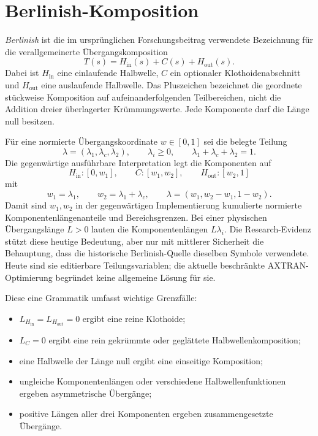 \section{Berlinish-Komposition}
\label{sec:berlinish-composition}

\emph{Berlinish} ist die im ursprünglichen Forschungsbeitrag verwendete
Bezeichnung für die verallgemeinerte Übergangskomposition
\[
T(s)
=
H_{\mathrm{in}}(s)
+
C(s)
+
H_{\mathrm{out}}(s).
\]
Dabei ist \(H_{\mathrm{in}}\) eine einlaufende Halbwelle, \(C\) ein
optionaler Klothoidenabschnitt und \(H_{\mathrm{out}}\) eine auslaufende
Halbwelle. Das Pluszeichen bezeichnet die geordnete stückweise Komposition auf
aufeinanderfolgenden Teilbereichen, nicht die Addition dreier überlagerter
Krümmungswerte. Jede Komponente darf die Länge null besitzen.

Für eine normierte Übergangskoordinate $w\in[0,1]$ sei die belegte Teilung
\[
\lambda=(\lambda_1,\lambda_c,\lambda_2),\qquad
\lambda_i\geq0,\qquad \lambda_1+\lambda_c+\lambda_2=1.
\]
Die gegenwärtige ausführbare Interpretation legt die Komponenten auf
\[
H_{\mathrm{in}}:[0,w_1],\qquad
C:[w_1,w_2],\qquad
H_{\mathrm{out}}:[w_2,1]
\]
mit
\begin{equation}
w_1=\lambda_1,\qquad
w_2=\lambda_1+\lambda_c,\qquad
\lambda=(w_1,w_2-w_1,1-w_2).
\label{eq:berlinish-partition-cuts}
\end{equation}
Damit sind $w_1,w_2$ in der gegenwärtigen Implementierung kumulierte
normierte Komponentenlängenanteile und Bereichsgrenzen. Bei einer physischen
Übergangslänge $L>0$ lauten die Komponentenlängen $L\lambda_i$. Die
Research-Evidenz stützt diese heutige Bedeutung, aber nur mit mittlerer
Sicherheit die Behauptung, dass die historische Berlinish-Quelle dieselben
Symbole verwendete. Heute sind sie editierbare Teilungsvariablen; die aktuelle
beschränkte AXTRAN-Optimierung begründet keine allgemeine Lösung für sie.

Diese eine Grammatik umfasst wichtige Grenzfälle:
\begin{itemize}
\item \(L_{H_{\mathrm{in}}}=L_{H_{\mathrm{out}}}=0\) ergibt eine reine
Klothoide;
\item \(L_C=0\) ergibt eine rein gekrümmte oder geglättete
Halbwellenkomposition;
\item eine Halbwelle der Länge null ergibt eine einseitige Komposition;
\item ungleiche Komponentenlängen oder verschiedene Halbwellenfunktionen
ergeben asymmetrische Übergänge;
\item positive Längen aller drei Komponenten ergeben zusammengesetzte
Übergänge.
\end{itemize}

